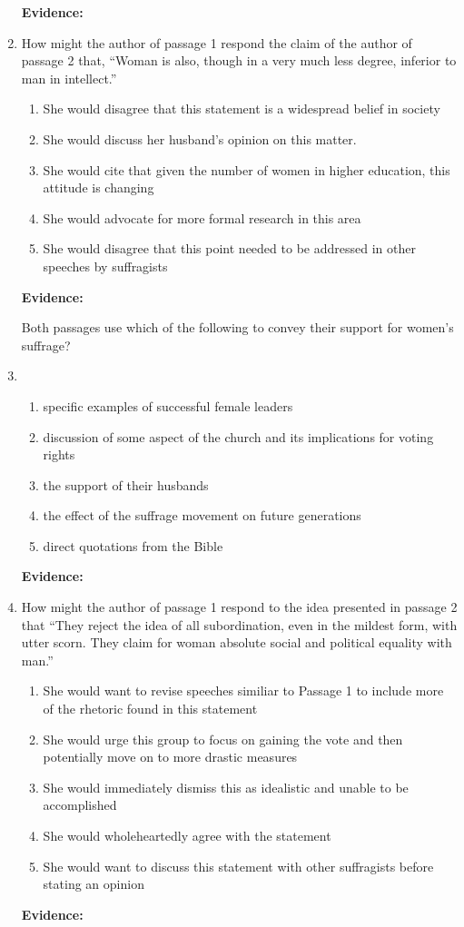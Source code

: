 \begin{enumerate}
\bigskip
\textbf{Evidence:} \hrulefill


\bigskip
\item How might the author of passage 1 respond the claim of the author of passage 2 that, ``Woman is also, though in a very much less degree, inferior to man in intellect.''

\bigskip
\begin{enumerate}[label=(\Alph*)]
\item She would disagree that this statement is a widespread belief in society
\item She would discuss her husband's opinion on this matter. 
\item She would cite that given the number of women in higher education, this attitude is changing
\item She would advocate for more formal research in this area
\item She would disagree that this point needed to be addressed in other speeches by suffragists
\end{enumerate}

\bigskip
\textbf{Evidence:} \hrulefill

\bigskip Both passages use which of the following to convey their support for women's suffrage?
\item 

\bigskip
\begin{enumerate}[label=(\Alph*)]
\item specific examples of successful female leaders
\item discussion of some aspect of the church and its implications for voting rights
\item the support of their husbands 
\item the effect of the suffrage movement on future generations
\item direct quotations from the Bible
\end{enumerate}

\bigskip
\textbf{Evidence:} \hrulefill

\bigskip
\item How might the author of passage 1 respond to the idea presented in passage 2 that ``They reject the idea of all subordination, even in the mildest form, with utter scorn. They claim for woman absolute social and political equality with man.''

\bigskip
\begin{enumerate}[label=(\Alph*)]
\item She would want to revise speeches similiar to Passage 1 to include more of the rhetoric found in this statement
\item She would urge this group to focus on gaining the vote and then potentially move on to more drastic measures
\item She would immediately dismiss this as idealistic and unable to be accomplished
\item She would wholeheartedly agree with the statement
\item She would want to discuss this statement with other suffragists before stating an opinion
\end{enumerate}

\bigskip
\textbf{Evidence:} \hrulefill
\end{enumerate}